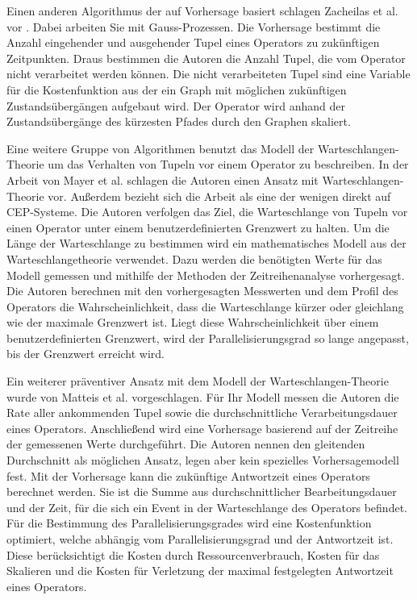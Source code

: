 Einen anderen Algorithmus der auf Vorhersage basiert schlagen Zacheilas et al. vor \cite{zacheilas_elastic_2015}.
Dabei arbeiten Sie mit Gauss-Prozessen.
Die Vorhersage bestimmt die Anzahl eingehender und ausgehender Tupel eines Operators zu zukünftigen Zeitpunkten.
Draus bestimmen die Autoren die Anzahl Tupel, die vom Operator nicht verarbeitet werden können.
Die nicht verarbeiteten Tupel sind eine Variable für die Kostenfunktion aus der ein Graph mit möglichen zukünftigen Zustandsübergängen aufgebaut wird.
Der Operator wird anhand der Zustandsübergänge des kürzesten Pfades durch den Graphen skaliert.

Eine weitere Gruppe von Algorithmen benutzt das Modell der Warteschlangen-Theorie um das Verhalten von Tupeln vor einem Operator zu beschreiben.
In der Arbeit von Mayer et al. \cite{mayer_predictable_2015} schlagen die Autoren einen Ansatz mit Warteschlangen-Theorie vor.
Außerdem bezieht sich die Arbeit als eine der wenigen direkt auf CEP-Systeme.
Die Autoren verfolgen das Ziel, die Warteschlange von Tupeln vor einen Operator unter einem benutzerdefinierten Grenzwert zu halten.
Um die Länge der Warteschlange zu bestimmen wird ein mathematisches Modell aus der Warteschlangetheorie verwendet.
Dazu werden die benötigten Werte für das Modell gemessen und mithilfe der Methoden der Zeitreihenanalyse vorhergesagt.
Die Autoren berechnen mit den vorhergesagten Messwerten und dem Profil des Operators die Wahrscheinlichkeit, dass die Warteschlange kürzer oder gleichlang wie der maximale Grenzwert ist.
Liegt diese Wahrscheinlichkeit über einem benutzerdefinierten Grenzwert, wird der Parallelisierungsgrad so lange angepasst, bis der Grenzwert erreicht wird.

Ein weiterer präventiver Ansatz mit dem Modell der Warteschlangen-Theorie wurde von Matteis et al. vorgeschlagen.
Für Ihr Modell messen die Autoren die Rate aller ankommenden Tupel sowie die durchschnittliche Verarbeitungsdauer eines Operators.
Anschließend wird eine Vorhersage basierend auf der Zeitreihe der gemessenen Werte durchgeführt. 
Die Autoren nennen den gleitenden Durchschnitt als möglichen Ansatz, legen aber kein spezielles Vorhersagemodell fest. 
Mit der Vorhersage kann die zukünftige Antwortzeit eines Operators berechnet werden.
Sie ist die Summe aus durchschnittlicher Bearbeitungsdauer und der Zeit, für die sich ein Event in der Warteschlange des Operators befindet.
Für die Bestimmung des Parallelisierungsgrades wird eine Kostenfunktion optimiert, welche abhängig vom Parallelisierungsgrad und der Antwortzeit ist.
Diese berücksichtigt die Kosten durch Ressourcenverbrauch, Kosten für das Skalieren und die Kosten für Verletzung der maximal festgelegten Antwortzeit eines Operators. 

